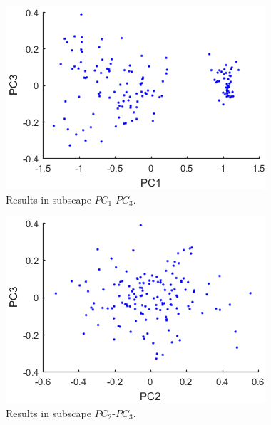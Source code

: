\documentclass[a4paper,11pt,twocolumn]{article}
\begin{document}
\begin{figure}[!h]
  \centering
  \includegraphics[width=\linewidth]{figures/PC1-PC3.png}
  \caption{Results in subscape $PC_1$-$PC_3$.}
  \label{fig:fig2}
\end{figure}

\begin{figure}[!h]
  \centering
  \includegraphics[width=\linewidth]{figures/PC2-PC3.png}
  \caption{Results in subscape $PC_2$-$PC_3$.}
  \label{fig:fig3}
\end{figure}
\end{document}
